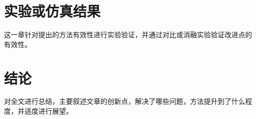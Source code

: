 \documentclass[a4paper, 12pt]{article} %
\numberwithin{equation}{section} %
\numberwithin{figure}{section} %
\begin{document}
    \section{实验或仿真结果} \label{sec:experiment}
    这一章针对提出的方法有效性进行实验验证，并通过对比或消融实验验证改进点的有效性。
    \section{结论} \label{sec:conclusion}
    对全文进行总结，主要叙述文章的创新点，解决了哪些问题，方法提升到了什么程度，并适度进行展望\cite{einstein,knuthwebsite,latexcompanion}。
    
    
\end{document}
